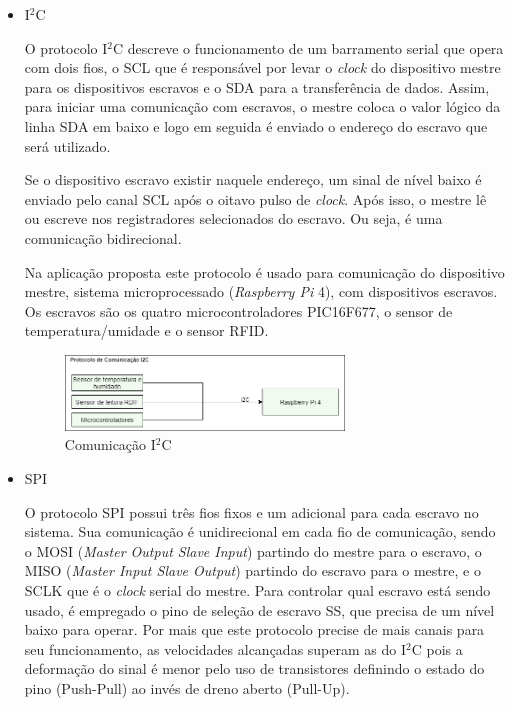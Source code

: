 \begin{itemize}
    \item I$^2$C
    
    O protocolo I$^2$C descreve o funcionamento de um barramento serial que opera com dois fios, o SCL que é responsável por levar o \textit{clock} do dispositivo mestre para os dispositivos escravos e o SDA para a transferência de dados. Assim, para iniciar uma comunicação com escravos, o mestre coloca o valor lógico da linha SDA em baixo e logo em seguida é enviado o endereço do escravo que será utilizado. 
    
    Se o dispositivo escravo existir naquele endereço, um sinal de nível baixo é enviado pelo canal SCL após o oitavo pulso de \textit{clock}. Após isso, o mestre lê ou escreve nos registradores selecionados do escravo. Ou seja, é uma comunicação bidirecional. 
    
    Na aplicação proposta este protocolo é usado para comunicação do dispositivo mestre, sistema microprocessado (\textit{Raspberry Pi} 4), com dispositivos escravos. Os escravos são os quatro microcontroladores PIC16F677, o sensor de temperatura/umidade e o sensor RFID.
    
    \begin{figure}[H]
    \centering
    \includegraphics[width=0.7\textwidth]{figuras/eletronica/fluxogramas/comunicacao_i2c.png}
    \caption{Comunicação I$^2$C}
    \label{fig:PC_i2c}
\end{figure}
    
    \item SPI
    
    O protocolo SPI possui três fios fixos e um adicional para cada escravo no sistema. Sua comunicação é unidirecional em cada fio de comunicação, sendo o MOSI (\textit{Master Output Slave Input}) partindo do mestre para o escravo, o MISO (\textit{Master Input Slave Output}) partindo do escravo para o mestre, e o SCLK que é o \textit{clock} serial do mestre. Para controlar qual escravo está sendo usado, é empregado o pino de seleção de escravo SS, que precisa de um nível baixo para operar. Por mais que este protocolo precise de mais canais para seu funcionamento, as velocidades alcançadas  superam as do I$^2$C pois a deformação do sinal é menor pelo uso de transistores definindo o estado do pino (Push-Pull) ao invés de dreno aberto (Pull-Up).
    

\end{itemize}
